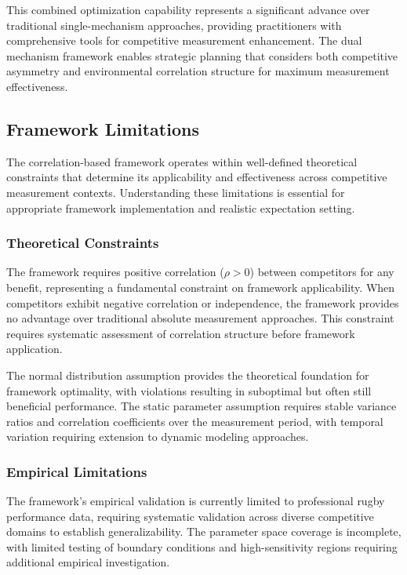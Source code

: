 This combined optimization capability represents a significant advance over traditional single-mechanism approaches, providing practitioners with comprehensive tools for competitive measurement enhancement. The dual mechanism framework enables strategic planning that considers both competitive asymmetry and environmental correlation structure for maximum measurement effectiveness.

\subsection{Framework Limitations}

The correlation-based framework operates within well-defined theoretical constraints that determine its applicability and effectiveness across competitive measurement contexts. Understanding these limitations is essential for appropriate framework implementation and realistic expectation setting.

\subsubsection{Theoretical Constraints}

The framework requires positive correlation ($\rho > 0$) between competitors for any benefit, representing a fundamental constraint on framework applicability. When competitors exhibit negative correlation or independence, the framework provides no advantage over traditional absolute measurement approaches. This constraint requires systematic assessment of correlation structure before framework application.

The normal distribution assumption provides the theoretical foundation for framework optimality, with violations resulting in suboptimal but often still beneficial performance. The static parameter assumption requires stable variance ratios and correlation coefficients over the measurement period, with temporal variation requiring extension to dynamic modeling approaches.

\subsubsection{Empirical Limitations}

The framework's empirical validation is currently limited to professional rugby performance data, requiring systematic validation across diverse competitive domains to establish generalizability. The parameter space coverage is incomplete, with limited testing of boundary conditions and high-sensitivity regions requiring additional empirical investigation.

